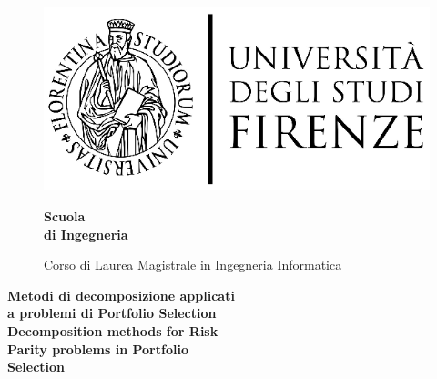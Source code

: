\thispagestyle{empty}
\begin{figure}[htbp]
\begin{minipage}{0.3\textwidth}
\centering
\includegraphics[scale=0.8]{logo_universita.eps}
\end{minipage}
\hspace{0.3\textwidth}
\begin{minipage}{0.4\textwidth}
\centering
\begin{flushright}
{\Large \textbf{Scuola\\
 di Ingegneria \\}
}
\end{flushright}
\begin{flushright}
Corso di Laurea Magistrale in Ingegneria Informatica
\end{flushright}
\end{minipage}

\end{figure}


\vspace{10mm}
\begin{center}

{\huge {\bf Metodi di decomposizione applicati\\}}
\vspace{2mm}
{\huge{\bf a problemi di Portfolio Selection}}\\
\vspace{15mm}
 {\huge {\bf Decomposition methods for Risk}}\\
 \vspace{2mm}
 {\huge{\bf Parity problems in Portfolio}}\\
 \vspace{2mm}
 {\huge{\bf Selection}}\\

\end{center}
\vspace{10mm}

